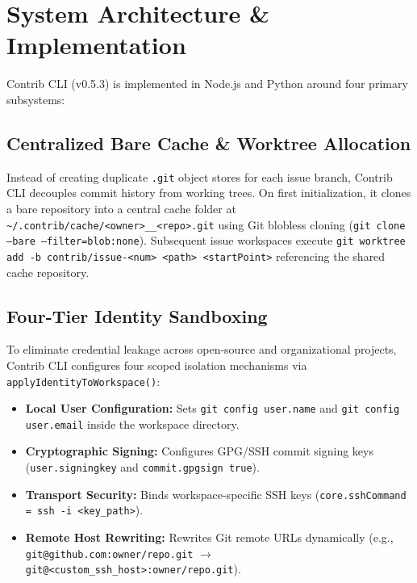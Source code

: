 \documentclass[10pt,conference]{IEEEtran}
\begin{document}
\section{System Architecture \& Implementation}
Contrib CLI (v0.5.3) is implemented in Node.js and Python around four primary subsystems:

\subsection{Centralized Bare Cache \& Worktree Allocation}
Instead of creating duplicate \texttt{.git} object stores for each issue branch, Contrib CLI decouples commit history from working trees. On first initialization, it clones a bare repository into a central cache folder at \texttt{\textasciitilde/.contrib/cache/<owner>\_\_<repo>.git} using Git blobless cloning (\texttt{git clone --bare --filter=blob:none}). Subsequent issue workspaces execute \texttt{git worktree add -b contrib/issue-<num> <path> <startPoint>} referencing the shared cache repository.

\subsection{Four-Tier Identity Sandboxing}
To eliminate credential leakage across open-source and organizational projects, Contrib CLI configures four scoped isolation mechanisms via \texttt{applyIdentityToWorkspace()}:
\begin{itemize}
    \item \textbf{Local User Configuration:} Sets \texttt{git config user.name} and \texttt{git config user.email} inside the workspace directory.
    \item \textbf{Cryptographic Signing:} Configures GPG/SSH commit signing keys (\texttt{user.signingkey} and \texttt{commit.gpgsign true}).
    \item \textbf{Transport Security:} Binds workspace-specific SSH keys (\texttt{core.sshCommand = ssh -i <key\_path>}).
    \item \textbf{Remote Host Rewriting:} Rewrites Git remote URLs dynamically (e.g., \texttt{git@github.com:owner/repo.git} $\rightarrow$ \texttt{git@<custom\_ssh\_host>:owner/repo.git}).
\end{itemize}
\end{document}
